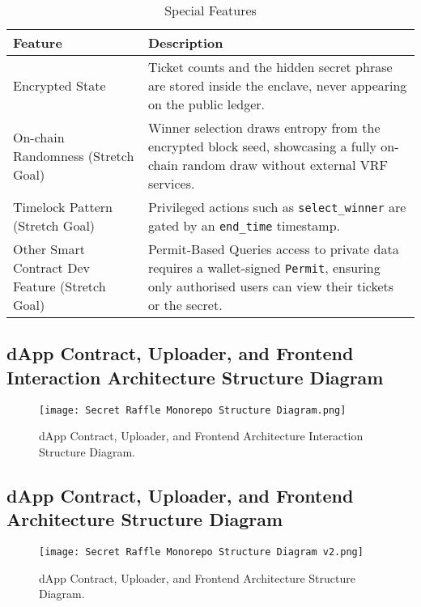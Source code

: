 \documentclass{article}
\begin{document}
\begin{table}[h]
  \centering
  \caption{Special Features}
  \label{tab:Special Features}
  \begin{tabularx}{\textwidth}{@{}lX@{}}
    \toprule
    \textbf{Feature} & \textbf{Description} \\
    \midrule
    Encrypted State & Ticket counts and the hidden secret phrase are stored inside the enclave, never appearing on the public ledger. \\
    \midrule
    On-chain Randomness (Stretch Goal) & Winner selection draws entropy from the encrypted block seed, showcasing a fully on-chain random draw without external VRF services. \\
    \midrule
    Timelock Pattern (Stretch Goal) & Privileged actions such as \texttt{select\_winner} are gated by an \texttt{end\_time} timestamp. \\
    \midrule
    Other Smart Contract Dev Feature (Stretch Goal) & Permit-Based Queries access to private data requires a wallet-signed \texttt{Permit}, ensuring only authorised users can view their tickets or the secret. \\
    \bottomrule
  \end{tabularx}
\end{table}

\newpage

\subsection{dApp Contract, Uploader, and Frontend Interaction Architecture Structure Diagram}
\begin{figure}[h]
  \vspace{-0.5cm}
  \hspace{-3cm}
  \texttt{[image: Secret Raffle Monorepo Structure Diagram.png]}
  \caption{dApp Contract, Uploader, and Frontend Architecture Interaction Structure Diagram.}
  \label{fig:dApp Contract, Uploader, and Frontend Architecture Interaction Structure Diagram Appendix}
\end{figure}

\subsection{dApp Contract, Uploader, and Frontend Architecture Structure Diagram}
\begin{figure}[h]
  \vspace{0cm}
  \hspace{-3cm}
  \texttt{[image: Secret Raffle Monorepo Structure Diagram v2.png]}
  \caption{dApp Contract, Uploader, and Frontend Architecture Structure Diagram.}
  \label{fig:dApp Contract, Uploader, and Frontend Architecture Structure Diagram Appendix}
\end{figure}
\end{document}
